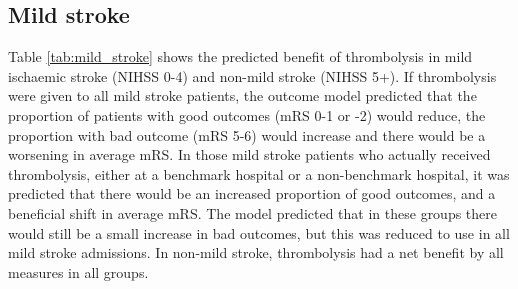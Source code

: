 \begin{minipage}{1\textwidth}
\begin{longtable}{p{5.2cm} | p{1.6cm} p{1.6cm} p{1.5cm} | p{1.6cm} p{1.6cm} p{1.5cm}}
\end{longtable}
\normalsize
\end{minipage}

\subsection{Mild stroke}

Table \ref{tab:mild_stroke} shows the predicted benefit of thrombolysis in mild ischaemic stroke (NIHSS 0-4) and non-mild stroke (NIHSS 5+). If thrombolysis were given to all mild stroke patients, the outcome model predicted that the proportion of patients with good outcomes (mRS 0-1 or -2) would reduce, the proportion with bad outcome (mRS 5-6) would increase and there would be a worsening in average mRS. In those mild stroke patients who actually received thrombolysis, either at a benchmark hospital or a non-benchmark hospital, it was predicted that there would be an increased proportion of good outcomes, and a beneficial shift in average mRS. The model predicted that in these groups there would still be a small increase in bad outcomes, but this was reduced to use in all mild stroke admissions. In non-mild stroke, thrombolysis had a net benefit by all measures in all groups.


